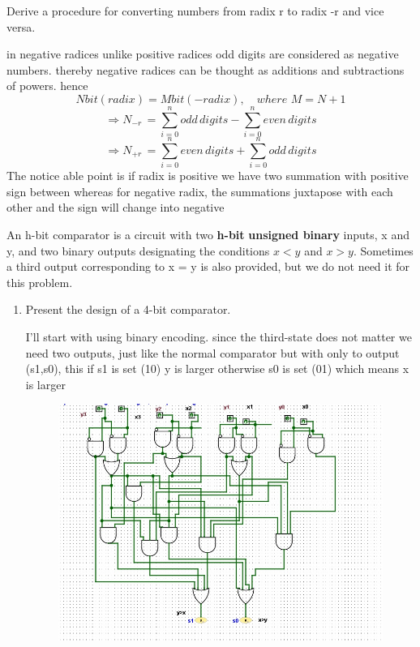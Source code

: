\documentclass[16pt,answers]{exam}
\begin{document}
\begin{questions}
\question Derive a procedure for converting numbers from radix r to radix -r and vice
versa.
\begin{solution}
	in negative radices unlike positive radices odd digits are considered as negative numbers. thereby negative radices can be thought as  additions and subtractions of powers. hence\[
		Nbit(radix)=Mbit(-radix),\quad where\,\, M = N+1
	\]
	\[
		\Rightarrow N_{-r}\,=   \sum_{i=0}^{n}{odd\,digits} - \sum_{i=0}^{n}{even\,digits}
	\]
	\[
		\Rightarrow  N_{+r}\,= \sum_{i=0}^{n}{even\,digits} +  \sum_{i=0}^{n}{odd\,digits}
	\]
	The notice able point is if radix is positive we have two summation with positive sign between whereas for negative radix, the summations juxtapose with each other and the sign will change into negative
\end{solution}
\question An h-bit comparator is a circuit with two \textbf{h-bit} \textbf{unsigned binary} inputs, x and y,
and two binary outputs designating the conditions \(x < y\) and \(x > y\). Sometimes a
third output corresponding to x = y is also provided, but we do not need it for this
problem.
\begin{enumerate}
	\item Present the design of a 4-bit comparator.
	\begin{solution}
		I'll start with using binary encoding. since the third-state does not matter we need two outputs, just like the normal comparator but with only to output (s1,s0), this if s1 is set (10) y is larger otherwise s0 is set (01) which means x is larger  \\
		\begin{figure}[H]
			\includegraphics{4bc.jpg}

\end{figure}
\end{solution}
\end{enumerate}
\end{questions}
\end{document}
